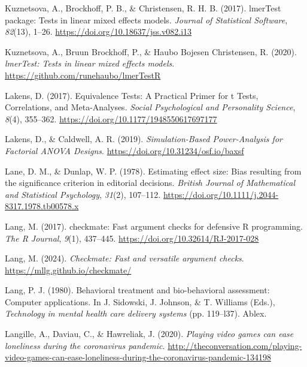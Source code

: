 \documentclass[
]{udthesis}
\newlength{\cslhangindent}
\newenvironment{CSLReferences}[2] %
 {\begin{list}{}{%
  \setlength{\itemindent}{0pt}
  \setlength{\leftmargin}{0pt}
  \setlength{\parsep}{0pt}
  \ifodd #1
   \setlength{\leftmargin}{\cslhangindent}
   \setlength{\itemindent}{-1\cslhangindent}
  \fi
  \setlength{\itemsep}{#2\baselineskip}}}
 {\end{list}}
\begin{document}
\begin{CSLReferences}{1}{0}
Kuznetsova, A., Brockhoff, P. B., \& Christensen, R. H. B. (2017). {lmerTest} package: Tests in linear mixed effects models. \emph{Journal of Statistical Software}, \emph{82}(13), 1--26. \url{https://doi.org/10.18637/jss.v082.i13}

Kuznetsova, A., Bruun Brockhoff, P., \& Haubo Bojesen Christensen, R. (2020). \emph{lmerTest: Tests in linear mixed effects models}. \url{https://github.com/runehaubo/lmerTestR}

Lakens, D. (2017). Equivalence {Tests}: {A Practical Primer} for t {Tests}, {Correlations}, and {Meta}-{Analyses}. \emph{Social Psychological and Personality Science}, \emph{8}(4), 355--362. \url{https://doi.org/10.1177/1948550617697177}

Lakens, D., \& Caldwell, A. R. (2019). \emph{Simulation-{Based Power}-{Analysis} for {Factorial ANOVA Designs}}. \url{https://doi.org/10.31234/osf.io/baxsf}

Lane, D. M., \& Dunlap, W. P. (1978). Estimating effect size: {Bias} resulting from the significance criterion in editorial decisions. \emph{British Journal of Mathematical and Statistical Psychology}, \emph{31}(2), 107--112. \url{https://doi.org/10.1111/j.2044-8317.1978.tb00578.x}

Lang, M. (2017). {checkmate}: Fast argument checks for defensive {R} programming. \emph{The R Journal}, \emph{9}(1), 437--445. \url{https://doi.org/10.32614/RJ-2017-028}

Lang, M. (2024). \emph{Checkmate: Fast and versatile argument checks}. \url{https://mllg.github.io/checkmate/}

Lang, P. J. (1980). Behavioral treatment and bio-behavioral assessment: Computer applications. In J. Sidowski, J. Johnson, \& T. Williams (Eds.), \emph{Technology in mental health care delivery systems} (pp. 119--l37). {Ablex}.

Langille, A., Daviau, C., \& Hawreliak, J. (2020). \emph{Playing video games can ease loneliness during the coronavirus pandemic}. \url{http://theconversation.com/playing-video-games-can-ease-loneliness-during-the-coronavirus-pandemic-134198}


\end{CSLReferences}
\end{document}
